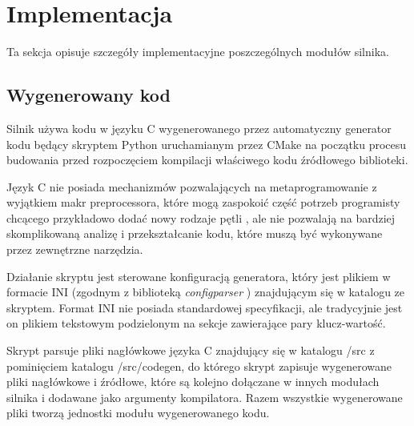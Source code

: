 \section {Implementacja}

Ta sekcja opisuje szczegóły implementacyjne poszczególnych modułów silnika.

\subsection{Wygenerowany kod}

Silnik używa kodu w języku C wygenerowanego przez automatyczny generator kodu będący skryptem Python uruchamianym przez CMake na początku procesu budowania przed rozpoczęciem kompilacji właściwego
kodu źródłowego biblioteki.

Język C nie posiada mechanizmów pozwalających na metaprogramowanie z wyjątkiem makr preprocessora, które mogą zaspokoić część potrzeb programisty chcącego przykładowo dodać nowy rodzaje pętli \cite{METACONTROLC}, ale nie pozwalają na bardziej skomplikowaną analizę i przekształcanie kodu, które muszą być wykonywane przez zewnętrzne narzędzia.

Działanie skryptu jest sterowane konfiguracją generatora, który jest plikiem w formacie INI (zgodnym z biblioteką \textit{configparser} \cite{PYTHONCONFIGPARSER}) znajdującym się w katalogu ze skryptem.
Format INI nie posiada standardowej specyfikacji, ale tradycyjnie jest on plikiem tekstowym podzielonym na sekcje zawierające pary klucz-wartość.

Skrypt parsuje pliki nagłówkowe języka C znajdujący się w katalogu /src z
pominięciem katalogu /src/codegen, do którego skrypt zapisuje wygenerowane pliki nagłówkowe i źródłowe, które są kolejno dołączane w innych modułach silnika i dodawane jako argumenty kompilatora.
Razem wszystkie wygenerowane pliki tworzą jednostki modułu wygenerowanego kodu.


